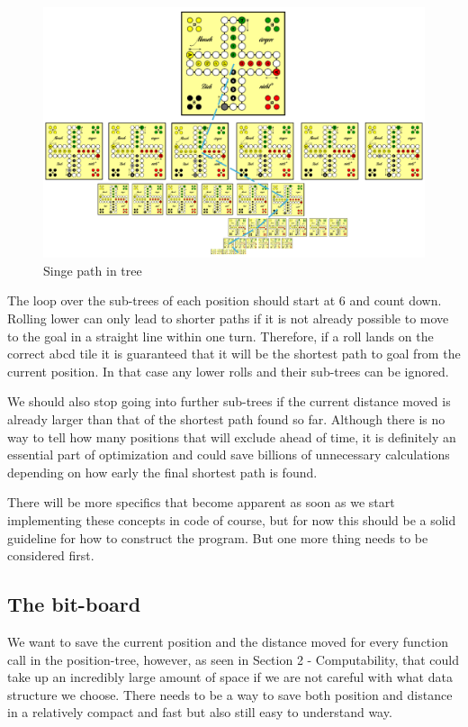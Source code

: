 \documentclass[12pt]{article} %
\begin{document}
\begin{figure}[htbp]
    \centering
    \includegraphics[width=1\textwidth]{images/Figure5}
    \caption{Singe path in tree}
    \label{fig:pathintree}
\end{figure}

The loop over the sub-trees of each position should start at 6 and count down. Rolling lower can only lead to shorter paths if it is not already possible to move to the goal in a straight line within one turn. Therefore, if a roll lands on the correct abcd tile it is guaranteed that it will be the shortest path to goal from the current position. In that case any lower rolls and their sub-trees can be ignored.

We should also stop going into further sub-trees if the current distance moved is already larger than that of the shortest path found so far. Although there is no way to tell how many positions that will exclude ahead of time, it is definitely an essential part of optimization and could save billions of unnecessary calculations depending on how early the final shortest path is found.

There will be more specifics that become apparent as soon as we start implementing these concepts in code of course, but for now this should be a solid guideline for how to construct the program. But one more thing needs to be considered first.

\subsection{The bit-board}
We want to save the current position and the distance moved for every function call in the position-tree, however, as seen in Section 2 - Computability, that could take up an incredibly large amount of space if we are not careful with what data structure we choose.
There needs to be a way to save both position and distance in a relatively compact and fast but also still easy to understand way.
\end{document}
